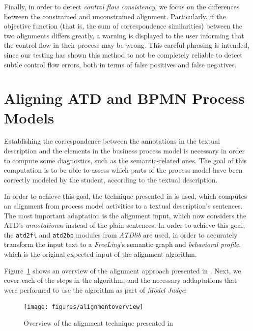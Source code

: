Finally, in order to detect \emph{control flow consistency}, we focus on the
differences between the constrained and unconstrained alignment. Particularly,
if the objective function (that is, the sum of correspondence similarities)
between the two alignments differs greatly, a warning is displayed to the user
informing that the control flow in their process may be wrong. This careful
phrasing is intended, since our testing has shown this method to not be
completely reliable to detect subtle control flow errors, both in terms of
false positives and false negatives.



\section{Aligning ATD and BPMN Process Models}
\label{sec:aligning_atd_bpmn}

Establishing the correspondence between the annotations in the textual
description and the elements in the business process model is necessary in order
to compute some diagnostics, such as the semantic-related ones. The goal of this
computation is to be able to assess which parts of the process model have been
correctly modeled by the student, according to the textual description.

In order to achieve this goal, the technique presented in
\cite{10.1007/978-3-319-59536-8_26} is used, which computes an alignment from
process model activities to a textual description's sentences. The most
important adaptation is the alignment input, which now considers the ATD's
\emph{annotations}s instead of the plain sentences. In order to achieve this
goal, the \texttt{atd2fl} and \texttt{atd2bp} modules from \emph{ATDlib} are
used, in order to accurately transform the input text to a \emph{FreeLing}'s
semantic graph and \emph{behavioral profile}, which is the original expected
input of the alignment algorithm.

Figure~\ref{fig:alignment_overview} shows an overview of the alignment approach
presented in \cite{10.1007/978-3-319-59536-8_26}. Next, we cover each of the
steps in the algorithm, and the necessary addaptations that were performed to
use the algorithm as part of \emph{Model Judge}:

\begin{figure}[htb]
  \centering
  \texttt{[image: figures/alignmentoverview]}
  \caption{Overview of the alignment technique presented in \cite{10.1007/978-3-319-59536-8_26}}
  \label{fig:alignment_overview}
\end{figure}
